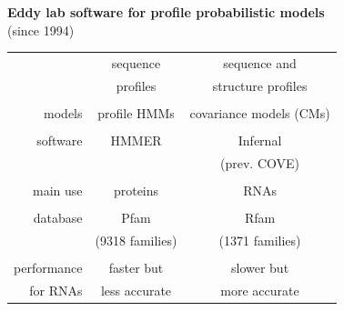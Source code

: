 \documentclass[landscape]{slides}
\begin{document}
\begin{slide}
\begin{center}
\textbf{Eddy lab software for profile probabilistic models} \\
(since 1994)
\end{center}
\medskip

\begin{center}
\small
\begin{tabular}{r|cc} 
             & sequence & sequence and \\
             & profiles & structure profiles \\ \hline
  \\
  models     & profile HMMs    & {\color{red} covariance models (CMs)} \\ 
  \\
  software   & {\sc HMMER}     & {\sc Infernal} \\ 
             &                 & (prev. COVE) \\
  \\
  main use   & proteins        & RNAs \\ 
  \\
  database   & {\sc Pfam}      & {\sc Rfam} \\
             & (9318 families) & (1371 families) \\
  \\
  performance& faster but    & slower but    \\
  for RNAs   & less accurate & more accurate \\
\end{tabular}


\end{center}
\end{slide}
\end{document}
